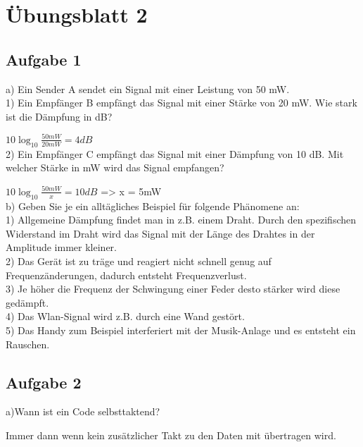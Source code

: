 \documentclass[12pt,a4paper,headsepline]{scrreprt}
\begin{document}


\section*{Übungsblatt 2}

\subsection*{Aufgabe 1}
a) Ein Sender A sendet ein Signal mit einer Leistung von 50 mW.\\

1) Ein Empfänger B empfängt das Signal mit einer Stärke von 20 mW. Wie stark ist die Dämpfung in dB?

$10 \log_{10} \frac{50mW}{20mW} = 4dB$\\

2) Ein Empfänger C empfängt das Signal mit einer Dämpfung von 10 dB. Mit welcher Stärke
in mW wird das Signal empfangen?

$10 \log_{10} \frac{50mW}{x} = 10dB$ => x = 5mW\\

b) Geben Sie je ein alltägliches Beispiel für folgende Phänomene an:\\

1) Allgemeine Dämpfung findet man in z.B. einem Draht. Durch den spezifischen Widerstand im Draht wird das Signal mit der Länge des Drahtes in der Amplitude immer kleiner.\\

2) Das Gerät ist zu träge und reagiert nicht schnell genug auf Frequenzänderungen, dadurch entsteht Frequenzverlust. \\

3) Je höher die Frequenz der Schwingung einer Feder desto stärker wird diese gedämpft.\\

4) Das Wlan-Signal wird z.B. durch eine Wand gestört.\\

5) Das Handy zum Beispiel interferiert mit der Musik-Anlage und es entsteht ein Rauschen.



\subsection*{Aufgabe 2}
a)Wann ist ein Code selbsttaktend?

Immer dann wenn kein zusätzlicher Takt zu den Daten mit übertragen wird.\\
\end{document}
